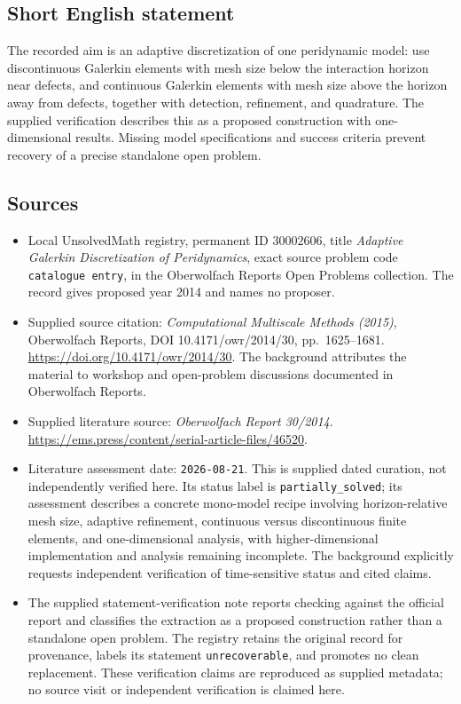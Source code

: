 \documentclass[11pt]{article}
\begin{document}
\subsection{Short English statement}
The recorded aim is an adaptive discretization of one peridynamic model: use discontinuous Galerkin elements with mesh size below the interaction horizon near defects, and continuous Galerkin elements with mesh size above the horizon away from defects, together with detection, refinement, and quadrature. The supplied verification describes this as a proposed construction with one-dimensional results. Missing model specifications and success criteria prevent recovery of a precise standalone open problem.
\subsection{Sources}
\begin{itemize}
\item Local UnsolvedMath registry, permanent ID \(30002606\), title \emph{Adaptive Galerkin Discretization of Peridynamics}, exact source problem code \texttt{catalogue entry}, in the Oberwolfach Reports Open Problems collection. The record gives proposed year 2014 and names no proposer.
\item Supplied source citation: \emph{Computational Multiscale Methods (2015)}, Oberwolfach Reports, DOI 10.4171/owr/2014/30, pp.\ 1625--1681. \url{https://doi.org/10.4171/owr/2014/30}. The background attributes the material to workshop and open-problem discussions documented in Oberwolfach Reports.
\item Supplied literature source: \emph{Oberwolfach Report 30/2014}. \url{https://ems.press/content/serial-article-files/46520}.
\item Literature assessment date: \texttt{2026-08-21}. This is supplied dated curation, not independently verified here. Its status label is \texttt{partially\_solved}; its assessment describes a concrete mono-model recipe involving horizon-relative mesh size, adaptive refinement, continuous versus discontinuous finite elements, and one-dimensional analysis, with higher-dimensional implementation and analysis remaining incomplete. The background explicitly requests independent verification of time-sensitive status and cited claims.
\item The supplied statement-verification note reports checking against the official report and classifies the extraction as a proposed construction rather than a standalone open problem. The registry retains the original record for provenance, labels its statement \texttt{unrecoverable}, and promotes no clean replacement. These verification claims are reproduced as supplied metadata; no source visit or independent verification is claimed here.
\end{itemize}
\end{document}
